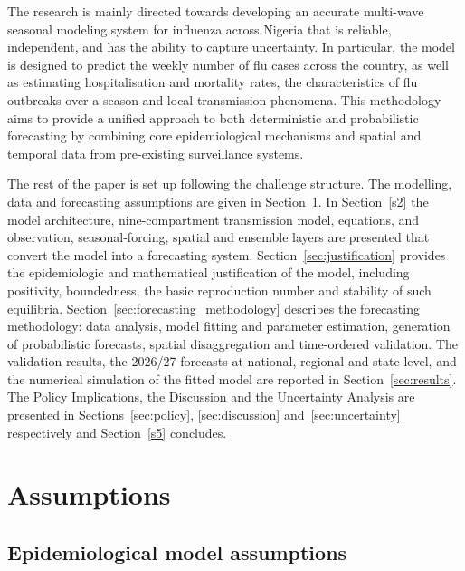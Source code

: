 \documentclass[12pt,a4paper]{article}
\theoremstyle{definition}
\theoremstyle{remark}
\begin{document}
The research is mainly directed towards developing an accurate multi-wave seasonal modeling system for influenza across Nigeria that is reliable, independent, and has the ability to capture uncertainty. In particular, the model is designed to predict the weekly number of flu cases across the country, as well as estimating hospitalisation and mortality rates, the characteristics of flu outbreaks over a season and local transmission phenomena. This methodology aims to provide a unified approach to both deterministic and probabilistic forecasting by combining core epidemiological mechanisms and spatial and temporal data from pre-existing surveillance systems.

The rest of the paper is set up following the challenge structure. The modelling, data and forecasting assumptions are given in Section~\ref{sec:assumptions}. In Section~\ref{s2} the model architecture, nine-compartment transmission model, equations, and observation, seasonal-forcing, spatial and ensemble layers are presented that convert the model into a forecasting system. Section~\ref{sec:justification} provides the epidemiologic and mathematical justification of the model, including positivity, boundedness, the basic reproduction number and stability of such equilibria. Section~\ref{sec:forecasting_methodology} describes the forecasting methodology: data analysis, model fitting and parameter estimation, generation of probabilistic forecasts, spatial disaggregation and time-ordered validation. The validation results, the 2026/27 forecasts at national, regional and state level, and the numerical simulation of the fitted model are reported in Section~\ref{sec:results}. The Policy Implications, the Discussion and the Uncertainty Analysis are presented in Sections~\ref{sec:policy}, \ref{sec:discussion} and~\ref{sec:uncertainty} respectively and Section~\ref{s5} concludes.








\section{Assumptions}\label{sec:assumptions}

\subsection{Epidemiological model assumptions}
\end{document}
